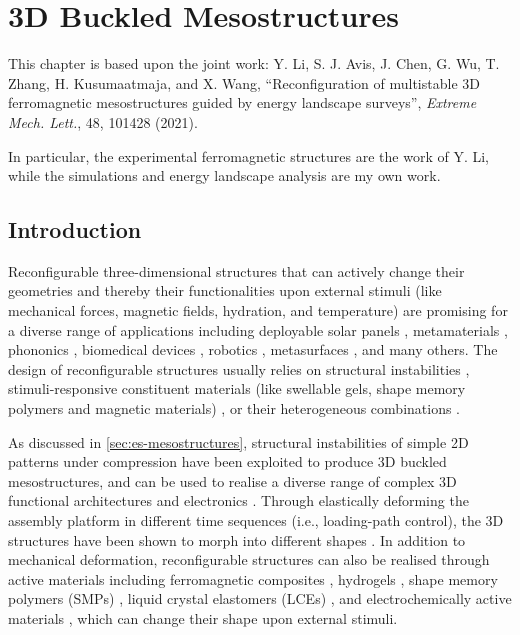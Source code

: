 \chapter{3D Buckled Mesostructures}
\label{ch:mesostructures}
\graphicspath{{mesostructures/fig/}}

This chapter is based upon the joint work: Y. Li, S. J. Avis, J. Chen, G. Wu, T. Zhang, H. Kusumaatmaja, and X. Wang, ``Reconfiguration of multistable 3D ferromagnetic mesostructures guided by energy landscape surveys'', \emph{Extreme Mech. Lett.}, 48, 101428 (2021).

In particular, the experimental ferromagnetic structures are the work of Y. Li, while the simulations and energy landscape analysis are my own work.


\section{Introduction}

Reconfigurable three-dimensional structures that can actively change their geometries and thereby their functionalities upon external stimuli (like mechanical forces, magnetic fields, hydration, and temperature) \cite{Overvelde2017,Filipov2015,Wehner2016,Kim2018,Gladman2016,Xie2010} are promising for a diverse range of applications including deployable solar panels \cite{Thesiya2015}, metamaterials \cite{Fu2011,Wang2017,Lee2020}, phononics \cite{Babaee2016,Deng2020}, biomedical devices \cite{Damdam2019,Anderson2017}, robotics \cite{Plitea2013,Tang2019,Gorissen2020}, metasurfaces \cite{Liu2019a,Wang2016}, and many others.
The design of reconfigurable structures usually relies on structural instabilities \cite{Chen2012,Jiang2019,Zareei2020}, stimuli-responsive constituent materials (like swellable gels, shape memory polymers and magnetic materials) \cite{Gladman2016,Lendlein2005,Kim2012,Novelino2020,Liu2019b}, or their heterogeneous combinations \cite{Ding2017}.

As discussed in \cref{sec:es-mesostructures}, structural instabilities of simple 2D patterns under compression have been exploited to produce 3D buckled mesostructures, and can be used to realise a diverse range of complex 3D functional architectures and electronics \cite{Xu2015,Zhang2015,Wang2019a,Jang2017,Lee2018a}.
Through elastically deforming the assembly platform in different time sequences (i.e., loading-path control), the 3D structures have been shown to morph into different shapes \cite{Fu2018,Pang2020}.
In addition to mechanical deformation, reconfigurable structures can also be realised through active materials including ferromagnetic composites \cite{Kim2018,Kim2019,Hu2018,Boncheva2005}, hydrogels \cite{Gladman2016}, shape memory polymers (SMPs) \cite{Xie2010,Wang2019a}, liquid crystal elastomers (LCEs) \cite{White2015}, and electrochemically active materials \cite{Xia2019}, which can change their shape upon external stimuli.

